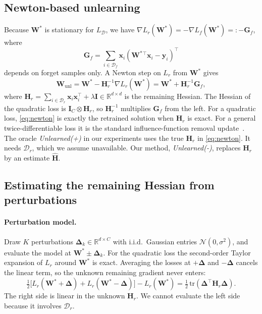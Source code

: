 \documentclass[10pt,twocolumn,letterpaper]{article}
\newcommand{\Hr}{\mathbf{H}_r}
\newcommand{\Hhat}{\widehat{\mathbf{H}}}
\newcommand{\Wstar}{\mathbf{W}^{*}}
\newcommand{\Dr}{\mathcal{D}_r}
\newcommand{\Df}{\mathcal{D}_f}
\begin{document}
\subsection{Newton-based unlearning}
\label{sec:newton}
Because $\Wstar$ is stationary for $L_{\mathcal{D}}$, we have $\nabla L_r(\Wstar)=-\nabla L_f(\Wstar)=:-\mathbf{G}_f$, where
\begin{equation}
 \mathbf{G}_f=\sum_{i\in\Df}\mathbf{x}_i(\Wstar{}^{\top}\mathbf{x}_i-\mathbf{y}_i)^\top
 \label{eq:gf}
\end{equation}
depends on forget samples only. A Newton step on $L_r$ from $\Wstar$ gives
\begin{equation}
  \mathbf{W}_{\text{unl}} = \Wstar - \Hr^{-1}\nabla L_r(\Wstar) = \Wstar + \Hr^{-1}\mathbf{G}_f,
  \label{eq:newton}
\end{equation}
where $\Hr=\sum_{i\in\Dr}\mathbf{x}_i\mathbf{x}_i^\top+\lambda\mathbf{I}\in\mathbb{R}^{d\times d}$ is the remaining Hessian. The Hessian of the quadratic loss is $\mathbf{I}_C\otimes\Hr$, so $\Hr^{-1}$ multiplies $\mathbf{G}_f$ from the left. For a quadratic loss, \cref{eq:newton} is exactly the retrained solution when $\Hr$ is exact. For a general twice-differentiable loss it is the standard influence-function removal update~\cite{koh2017understanding,guo2020certified}. The oracle \emph{Unlearned(+)} in our experiments uses the true $\Hr$ in \cref{eq:newton}. It needs $\Dr$, which we assume unavailable. Our method, \emph{Unlearned(-)}, replaces $\Hr$ by an estimate $\Hhat$.

\subsection{Estimating the remaining Hessian from perturbations}
\label{sec:hessian}
\paragraph{Perturbation model.}
Draw $K$ perturbations $\boldsymbol{\Delta}_k\in\mathbb{R}^{d\times C}$ with i.i.d.\ Gaussian entries $\mathcal{N}(0,\sigma^2)$, and evaluate the model at $\Wstar\pm\boldsymbol{\Delta}_k$. For the quadratic loss the second-order Taylor expansion of $L_r$ around $\Wstar$ is exact. Averaging the losses at $+\boldsymbol{\Delta}$ and $-\boldsymbol{\Delta}$ cancels the linear term, so the unknown remaining gradient never enters:
\begin{equation}
  \tfrac12\big[L_r(\Wstar{+}\boldsymbol{\Delta})+L_r(\Wstar{-}\boldsymbol{\Delta})\big]-L_r(\Wstar)=\tfrac12\,\mathrm{tr}(\boldsymbol{\Delta}^\top\Hr\boldsymbol{\Delta}).
  \label{eq:quad}
\end{equation}
The right side is linear in the unknown $\Hr$. We cannot evaluate the left side because it involves $\Dr$.
\end{document}
